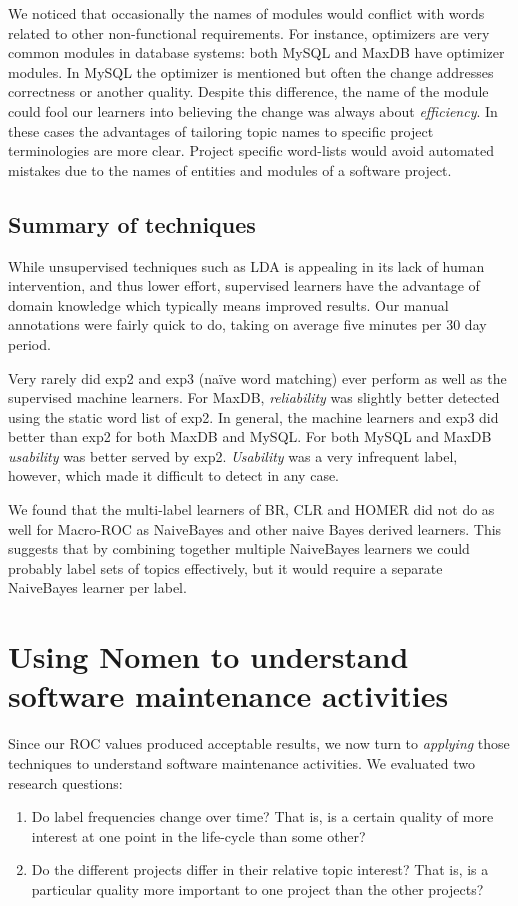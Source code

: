 \documentclass[]{sig-alternate}
\begin{document}
We noticed that occasionally the names of modules would conflict with words related to other non-functional requirements. 
For instance, optimizers are very common modules in database systems: both MySQL and MaxDB have optimizer modules. 
In MySQL the optimizer is mentioned but often the change addresses  correctness or another quality. 
Despite this difference, the name of the module could fool our learners into believing the change was always about \emph{efficiency}. 
In these cases the advantages of tailoring topic names to specific project terminologies are more clear. 
Project specific word-lists would avoid automated mistakes due to the names of entities and modules of a software project.

\subsection{Summary of techniques}
While unsupervised techniques such as LDA is appealing in its lack of human intervention, and thus lower effort, 
supervised learners have the advantage of domain knowledge which typically means improved results. 
Our manual annotations were fairly quick to do, taking on average five minutes per 30 day period. 

Very rarely did \textsf{exp2} and \textsf{exp3} (naïve word matching) ever perform as well as the supervised machine learners. 
For MaxDB, \textit{reliability} was slightly better detected using the static word list of \textsf{exp2}. 
In general, the machine learners and \textsf{exp3} did better than \textsf{exp2} for both MaxDB and MySQL. 
For both MySQL and MaxDB \textit{usability} was better served by \textsf{exp2}. 
\textit{Usability} was a very infrequent label, however, which made it difficult to detect in any case.

We found that the multi-label learners of BR, CLR and HOMER did not do as well for Macro-ROC as NaiveBayes and other naive Bayes derived learners. 
This suggests that by combining together multiple NaiveBayes learners we could probably label sets of topics effectively, but it would require a separate NaiveBayes learner per label.


\section{Using \textbf{Nomen} to understand software maintenance activities} 
\label{sec:analysis}
Since our ROC values produced acceptable results, we now turn to \emph{applying} those techniques to understand software maintenance activities. We evaluated two research questions:
\begin{enumerate}
\item Do label frequencies change over time? That is, is a certain quality of more interest at one point in the life-cycle than some other? 
\item  Do the different projects differ in their relative topic interest? That is, is a particular quality more important to one project than the other projects?  
\end{enumerate}
\end{document}
